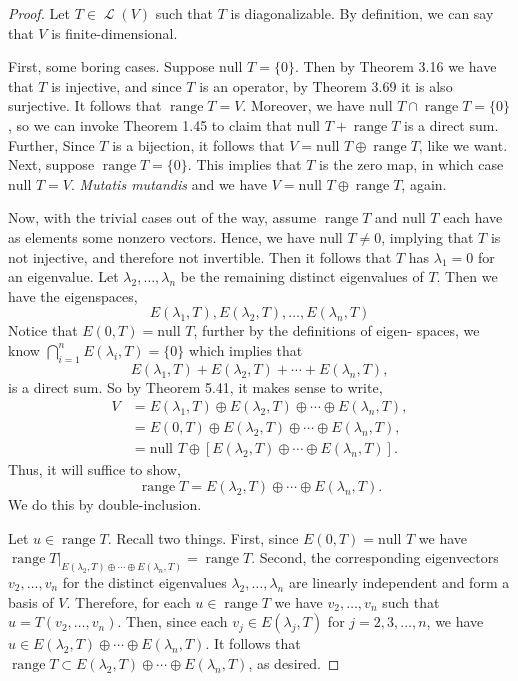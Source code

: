 \documentclass[letterpaper, 12pt]{amsart}
\DeclareMathOperator{\Ell}{\mathscr{L}}				%
\renewcommand{\null}{\text{null }}					%
\DeclareMathOperator{\range}{\text{range }}			%
\theoremstyle{definition}  							%
\begin{document}
		\begin{proof}
		Let $T \in \Ell(V)$ such that $T$ is diagonalizable.
		By definition, we can say that $V$ is finite-dimensional.

		First, some boring cases.
		Suppose $\null T = \{ 0 \}$.
		Then by Theorem 3.16 we have that $T$ is injective, and since $T$ is an operator, by Theorem 3.69 it is also surjective.
		It follows that $\range T = V$.
		Moreover, we have $\null T \cap \range T = \{ 0 \}$, so we can invoke Theorem 1.45 to claim that $\null T + \range T$ is a direct sum.
		Further, Since $T$ is a bijection, it follows that $V = \null T \oplus \range T$, like we want.
		Next, suppose $\range T = \{ 0 \}$.
		This implies that $T$ is the zero map, in which case $\null T = V$.
		\textit{Mutatis mutandis} and we have $V = \null T \oplus \range T$, again.

		Now, with the trivial cases out of the way, assume $\range T$ and $\null T$ each have as elements some nonzero vectors.
		Hence, we have $\null T \neq 0$, implying that $T$ is not injective, and therefore not invertible.
		Then it follows that $T$ has $\lambda_{1} = 0$ for an eigenvalue.
		Let $\lambda_{2}, \dots, \lambda_{n}$ be the remaining distinct eigenvalues of $T$.
		Then we have the eigenspaces, $$E(\lambda_{1}, T), E(\lambda_{2},T), \dots, E(\lambda_{n}, T)$$
		Notice that $E(0,T) = \null T$, further by the definitions of eigen-
		spaces, we know $\bigcap_{i=1}^{n} E(\lambda_{i},T) = \{ 0 \}$ which implies that $$E(\lambda_{1}, T) + E(\lambda_{2},T) + \cdots + E(\lambda_{n}, T),$$ is a direct sum.
		So by Theorem 5.41, it makes sense to write,
			\begin{align*}
				V &= E(\lambda_{1}, T) \oplus E(\lambda_{2},T) \oplus \cdots \oplus E(\lambda_{n}, T), \\
				&= E(0, T) \oplus E(\lambda_{2},T) \oplus \cdots \oplus E(\lambda_{n}, T), \\
				&= \null T \oplus \left[ E(\lambda_{2},T) \oplus \cdots \oplus E(\lambda_{n}, T) \right].
			\end{align*}
		Thus, it will suffice to show, $$\range T = E(\lambda_{2},T) \oplus \cdots \oplus E(\lambda_{n}, T).$$
		We do this by double-inclusion.

		Let $u \in \range T$.
		Recall two things.
		First, since $E(0,T) = \null T$ we have $\range T|_{E(\lambda_{2},T) \oplus \cdots \oplus E(\lambda_{n}, T)} = \range T$.
		Second, the corresponding eigenvectors $v_{2}, \dots, v_{n}$ for the distinct eigenvalues $\lambda_{2}, \dots, \lambda_{n}$ are linearly independent and form a basis of $V$.
		Therefore, for each $u \in \range T$ we have $v_{2}, \dots, v_{n}$ such that $u = T(v_{2}, \dots, v_{n})$.
		Then, since each $v_{j} \in E(\lambda_{j},T)$ for $j = 2,3,\dots,n$, we have $u \in E(\lambda_{2},T) \oplus \cdots \oplus E(\lambda_{n}, T)$.
		It follows that $\range T \subset E(\lambda_{2},T) \oplus \cdots \oplus E(\lambda_{n}, T)$, as desired.


\end{proof}
\end{document}
